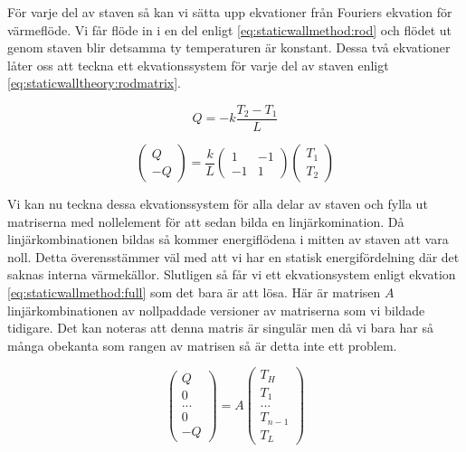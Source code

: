 För varje del av staven så kan vi sätta upp ekvationer från Fouriers ekvation
för värmeflöde. Vi får flöde in i en del enligt \eqref{eq:staticwallmethod:rod} och
flödet ut genom staven blir detsamma ty temperaturen är konstant. Dessa två
ekvationer låter oss att teckna ett ekvationssystem för varje del av staven
enligt \eqref{eq:staticwalltheory:rodmatrix}.

\begin{equation}
\label{eq:staticwallmethod:rod}
Q = -k\frac{T_{2}-T_{1}}{L}
\end{equation}


\begin{equation}
\label{eq:staticwalltheory:rodmatrix}
\begin{pmatrix}
Q \\
-Q
\end{pmatrix} = 
\frac{k}{L}\begin{pmatrix}
1 & -1 \\
-1 & 1
\end{pmatrix}
\begin{pmatrix}
T_1 \\
T_2
\end{pmatrix}
\end{equation}

\noindent
Vi kan nu teckna dessa ekvationssystem för alla delar av staven och fylla
ut matriserna med nollelement för att sedan bilda en linjärkomination.
Då linjärkombinationen bildas så kommer energiflödena i mitten av staven att
vara noll. Detta överensstämmer väl med att vi har en statisk energifördelning
där det saknas interna värmekällor.
Slutligen så får vi ett ekvationsystem enligt ekvation
\eqref{eq:staticwallmethod:full} som det bara är att lösa. Här
är matrisen $A$ linjärkombinationen av nollpaddade versioner av
matriserna som vi bildade tidigare.
Det kan noteras att denna matris är singulär men då vi bara har så många
obekanta som rangen av matrisen så är detta inte ett problem.

\begin{equation}
\label{eq:staticwallmethod:full}
\begin{pmatrix}
Q\\0\\...\\0\\-Q
\end{pmatrix} = A
\begin{pmatrix}
T_H\\T_1\\...\\T_{n-1}\\T_L
\end{pmatrix}
\end{equation}
